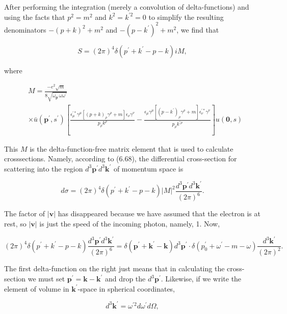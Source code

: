\documentclass[10pt, letterpaper]{article}
\begin{document}
After performing the integration (merely a convolution of delta-functions) and using the facts that $p^{2}=m^{2}$ and $k^{2}=k^{\prime 2}=0$ to simplify the resulting denominators $-(p+k)^{2}+m^{2}$ and $-\left(p-k^{\prime}\right)^{2}+m^{2}$, we find that

$$
S=(2 \pi)^{4} \delta\left(p^{\prime}+k^{\prime}-p-k\right) i M,
$$

where

$$
\begin{aligned}
& M=\frac{-e^{2} \sqrt{m}}{8 \sqrt{\omega_{\mathbf{p}^{\prime}} \omega \omega^{\prime}}} \\
& \times \bar{u}\left(\mathbf{p}^{\prime}, s^{\prime}\right)\left[\frac{\epsilon_{\mu}^{\prime *} \gamma^{\mu}\left[(p+k)_{\rho} \gamma^{\rho}+m\right] \epsilon_{\nu} \gamma^{\nu}}{p_{\rho} k^{\rho}}-\frac{\epsilon_{\mu} \gamma^{\mu}\left[\left(p-k^{\prime}\right)_{\rho} \gamma^{\rho}+m\right] \epsilon_{\nu}^{\prime *} \gamma^{\nu}}{p_{\rho} k^{\prime \rho}}\right] u(\mathbf{0}, s)
\end{aligned}
$$

This $M$ is the delta-function-free matrix element that is used to calculate crosssections. Namely, according to (6.68), the differential cross-section for scattering into the region $d^{3} \mathbf{p}^{\prime} d^{3} \mathbf{k}^{\prime}$ of momentum space is

$$
d \sigma=(2 \pi)^{4} \delta\left(p^{\prime}+k^{\prime}-p-k\right)|M|^{2} \frac{d^{3} \mathbf{p}^{\prime} d^{3} \mathbf{k}^{\prime}}{(2 \pi)^{6}} .
$$

The factor of $|\mathbf{v}|$ has disappeared because we have assumed that the electron is at rest, so $|\mathbf{v}|$ is just the speed of the incoming photon, namely, 1. Now,

$$
(2 \pi)^{4} \delta\left(p^{\prime}+k^{\prime}-p-k\right) \frac{d^{3} \mathbf{p}^{\prime} d^{3} \mathbf{k}^{\prime}}{(2 \pi)^{6}}=\delta\left(\mathbf{p}^{\prime}+\mathbf{k}^{\prime}-\mathbf{k}\right) d^{3} \mathbf{p}^{\prime} \cdot \delta\left(p_{0}^{\prime}+\omega^{\prime}-m-\omega\right) \frac{d^{3} \mathbf{k}^{\prime}}{(2 \pi)^{2}} .
$$

The first delta-function on the right just means that in calculating the cross-section we must set $\mathbf{p}^{\prime}=\mathbf{k}-\mathbf{k}^{\prime}$ and drop the $d^{3} \mathbf{p}^{\prime}$. Likewise, if we write the element of volume in $\mathbf{k}^{\prime}$-space in spherical coordinates,

$$
d^{3} \mathbf{k}^{\prime}=\omega^{\prime 2} d \omega^{\prime} d \Omega,
$$
\end{document}
